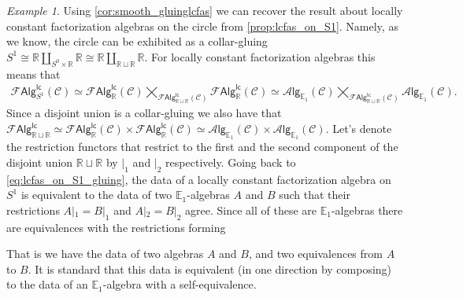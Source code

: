 \documentclass[12pt,a4paper]{article}
\newcounter{counter} \numberwithin{counter}{section}
\theoremstyle{definition}
\theoremstyle{plain}
\theoremstyle{remark}
\newtheorem{example}[counter]{Example}
\newcommand{\catC}{\mathscr{C}}
\newcommand{\lcfa}{\mathscr{F} \mathsf{Alg}^{\mathsf{lc}}}
\newcommand{\alg}[1]{\mathscr{A} \mathsf{lg}_{#1}}
\begin{document}
\begin{example}\label{ex:reproduce_lcfas_on_S1}
    Using \cref{cor:smooth_gluinglcfas} we can recover the result about locally constant factorization algebras on the circle from \cref{prop:lcfas_on_S1}. Namely, as we know, the circle can be exhibited as a collar-gluing $S^1 \cong \mathbb{R} \coprod_{S^0 \times \mathbb{R}} \mathbb{R} \cong \mathbb{R} \coprod_{\mathbb{R} \sqcup \mathbb{R}} \mathbb{R}$. For locally constant factorization algebras this means that
    \begin{align}\label{eq:lcfas_on_S1_gluing}
        \lcfa_{S^1} (\catC) \simeq \lcfa_{\mathbb{R}} (\catC) \bigtimes_{\lcfa_{\mathbb{R} \sqcup \mathbb{R}} (\catC)} \lcfa_{\mathbb{R}} (\catC) \simeq \alg{\mathbb{E}_1} (\catC) \bigtimes_{\lcfa_{\mathbb{R} \sqcup \mathbb{R}} (\catC)} \alg{\mathbb{E}_1} (\catC).
    \end{align}
    Since a disjoint union is a collar-gluing we also have that $\lcfa_{\mathbb{R} \sqcup \mathbb{R}} \simeq \lcfa_{\mathbb{R}} (\catC) \times \lcfa_{\mathbb{R}} (\catC) \simeq \alg{\mathbb{E}_1} (\catC) \times \alg{\mathbb{E}_1} (\catC)$. Let's denote the restriction functors that restrict to the first and the second component of the disjoint union $\mathbb{R} \sqcup \mathbb{R}$ by $|_1$ and $|_2$ respectively. Going back to \cref{eq:lcfas_on_S1_gluing}, the data of a locally constant factorization algebra on $S^1$ is equivalent to the data of two $\mathbb{E}_1$-algebras $A$ and $B$ such that their restrictions $A|_1 = B|_1$ and $A|_2 = B|_2$ agree. Since all of these are $\mathbb{E}_1$-algebras there are equivalences with the restrictions forming
    \begin{center}
    \end{center}
    That is we have the data of two algebras $A$ and $B$, and two equivalences from $A$ to $B$. It is standard that this data is equivalent (in one direction by composing) to the data of an $\mathbb{E}_1$-algebra with a self-equivalence.
\end{example}
\end{document}
